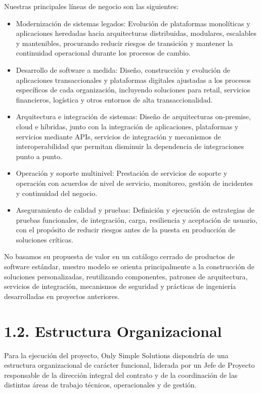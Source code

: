 \documentclass[11pt]{article}
\providecommand{\tightlist}{%
  \setlength{\itemsep}{0pt}\setlength{\parskip}{0pt}}
\begin{document}
Nuestras principales líneas de negocio son las siguientes:

\begin{itemize}
\tightlist
\item
  Modernización de sistemas legados: Evolución de plataformas monolíticas y aplicaciones heredadas hacia arquitecturas distribuidas, modulares, escalables y mantenibles, procurando reducir riesgos de transición y mantener la continuidad operacional durante los procesos de cambio.
\item
  Desarrollo de software a medida: Diseño, construcción y evolución de aplicaciones transaccionales y plataformas digitales ajustadas a los procesos específicos de cada organización, incluyendo soluciones para retail, servicios financieros, logística y otros entornos de alta transaccionalidad.
\item
  Arquitectura e integración de sistemas: Diseño de arquitecturas on-premise, cloud e híbridas, junto con la integración de aplicaciones, plataformas y servicios mediante APIs, servicios de integración y mecanismos de interoperabilidad que permitan disminuir la dependencia de integraciones punto a punto.
\item
  Operación y soporte multinivel: Prestación de servicios de soporte y operación con acuerdos de nivel de servicio, monitoreo, gestión de incidentes y continuidad del negocio.
\item
  Aseguramiento de calidad y pruebas: Definición y ejecución de estrategias de pruebas funcionales, de integración, carga, resiliencia y aceptación de usuario, con el propósito de reducir riesgos antes de la puesta en producción de soluciones críticas.
\end{itemize}

No basamos su propuesta de valor en un catálogo cerrado de productos de software estándar, nuestro modelo se orienta principalmente a la construcción de soluciones personalizadas, reutilizando componentes, patrones de arquitectura, servicios de integración, mecanismos de seguridad y prácticas de ingeniería desarrolladas en proyectos anteriores.

\section{1.2. Estructura Organizacional}\label{estructura-organizacional}

Para la ejecución del proyecto, Only Simple Solutions dispondría de una estructura organizacional de carácter funcional, liderada por un Jefe de Proyecto responsable de la dirección integral del contrato y de la coordinación de las distintas áreas de trabajo técnicos, operacionales y de gestión.
\end{document}
